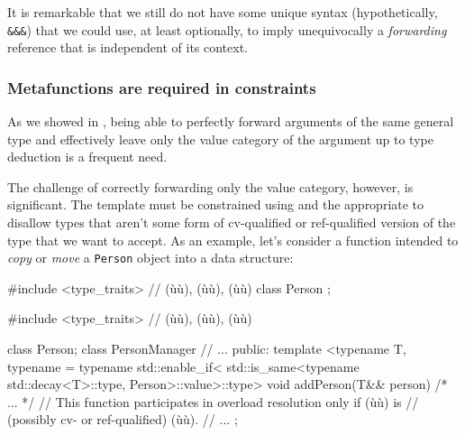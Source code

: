 \noindent It is remarkable that we still do not have some unique syntax
(hypothetically, \lstinline!&&&!) that we could use, at least optionally, to imply
unequivocally a \emph{forwarding} reference that is independent of its
context.

\subsubsection[Metafunctions are required in constraints]{Metafunctions are required in constraints}\label{metafunctions-are-required-in-constraints}

As we showed in ,
being able to
perfectly forward arguments of the same general type and effectively
leave only the value category of the argument up to type deduction is a frequent need. 

The challenge of correctly forwarding only the value category, however, is significant. The template
must be constrained using  and the appropriate
 to disallow types that aren't some form of
cv-qualified or ref-qualified version of the type that we want to
accept. As an example, let's consider a function intended to \emph{copy}
or \emph{move} a \lstinline!Person! object into a data structure:

\begin{emcppshiddenlisting}[emcppsbatch=e20]
#include <type_traits>  // (ù{}ù), (ù{}ù), (ù{}ù)
class Person {};
\end{emcppshiddenlisting}
\begin{emcppslisting}[emcppsbatch=e20]
#include <type_traits> // (ù{}ù), (ù{}ù), (ù{}ù)       
                                                                                
class Person;
class PersonManager {
    // ...
public:
    template <typename T, typename = typename std::enable_if<
           std::is_same<typename std::decay<T>::type, Person>::value>::type>
    void addPerson(T&& person) { /* ... */ }
        // This function participates in overload resolution only if (ù{}ù) is
        // (possibly cv- or ref-qualified) (ù{}ù).
    // ...
};
\end{emcppslisting}

